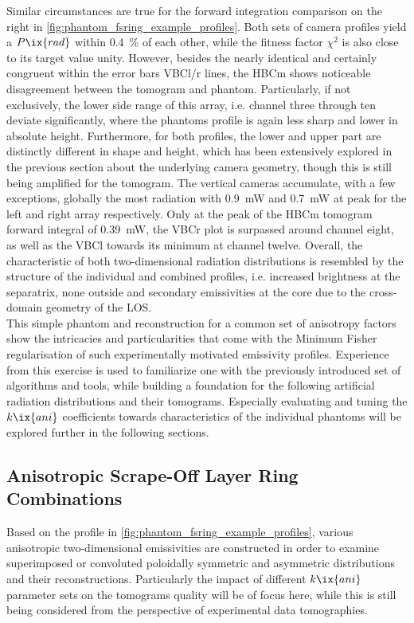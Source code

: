            Similar circumstances are true for the forward integration comparison on the right in \cref{fig:phantom_fsring_example_profiles}. Both sets of camera profiles yield a $P\ix{rad}$ within \SI{0.4}{\percent} of each other, while the fitness factor $\chi^{2}$ is also close to its target value unity. However, besides the nearly identical and certainly congruent within the error bars VBCl/r lines, the HBCm shows noticeable disagreement between the tomogram and phantom. Particularly, if not exclusively, the lower side range of this array, i.e. channel three through ten deviate significantly, where the phantoms profile is again less sharp and lower in absolute height. Furthermore, for both profiles, the lower and upper part are distinctly different in shape and height, which has been extensively explored in the previous section about the underlying camera geometry, though this is still being amplified for the tomogram. The vertical cameras accumulate, with a few exceptions, globally the most radiation with \SI{0.9}{\milli\watt} and \SI{0.7}{\milli\watt} at peak for the left and right array respectively. Only at the peak of the HBCm tomogram forward integral of \SI{0.39}{\milli\watt}, the VBCr plot is surpassed around channel eight, as well as the VBCl towards its minimum at channel twelve. Overall, the characteristic of both two-dimensional radiation distributions is resembled by the structure of the individual and combined profiles, i.e. increased brightness at the separatrix, none outside and secondary emissivities at the core due to the cross-domain geometry of the LOS.\\%
           This simple phantom and reconstruction for a common set of anisotropy factors show the intricacies and particularities that come with the Minimum Fisher regularisation of such experimentally motivated emissivity profiles. Experience from this exercise is used to familiarize one with the previously introduced set of algorithms and tools, while building a foundation for the following artificial radiation distributions and their tomograms. Especially evaluating and tuning the $k\ix{ani}$ coefficients towards characteristics of the individual phantoms will be explored further in the following sections.%
%
        \subsection{Anisotropic Scrape-Off Layer Ring Combinations}\label{subsec:phantoms_anirings}%
%
            Based on the profile in \cref{fig:phantom_fsring_example_profiles}, various anisotropic two-dimensional emissivities are constructed in order to examine superimposed or convoluted poloidally symmetric and asymmetric distributions and their reconstructions. Particularly the impact of different $k\ix{ani}$ parameter sets on the tomograms quality will be of focus here, while this is still being considered from the perspective of experimental data tomographies.\\%
%
